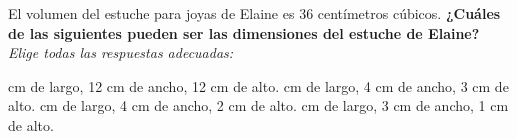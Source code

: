 El volumen del estuche para joyas de Elaine es 36 centímetros cúbicos.
\textbf{¿Cuáles de las siguientes pueden ser las dimensiones del estuche de Elaine?}
\emph{Elige todas las respuestas adecuadas:}

\begin{checkboxes}
     cm  de largo, 12 cm de ancho, 12 cm de alto.
     cm  de largo, 4 cm de ancho, 3 cm de alto.
     cm  de largo, 4 cm de ancho, 2 cm de alto.
     cm  de largo, 3 cm de ancho, 1 cm de alto.
\end{checkboxes}
